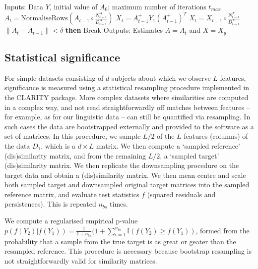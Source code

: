 \documentclass[a4]{article}
\newcommand{\+}[1]{\mathbf{#1}}
\newcommand{\norm}[1]{\|#1\|}
\begin{document}
\begin{algorithmic}
\STATE Inputs: Data $Y$, initial value of $A_0$; maximum number of iterations $t_{max}$
\STATE $A_{t} = \mathrm{NormaliseRows} \left(A_{t - 1} \circ \frac{N^{A}_{t-1}}{D^{A}_{t-1}} \right)$
\STATE $X_{t} = A_{t-1}^{+}Y_{1}(A^{+}_{t-1})^{T}$
\ELSE
\STATE $X_{t} = X_{t-1} \circ \frac{N^{X}_{t-1}}{D^{X}_{t-1}}$
\ENDIF
{} $\norm{A_{t}-A_{t-1}}< \delta$ {\bf then} Break
\ENDFOR
\STATE Outputs: Estimates $A=A_{t}$ and $X=X_{y}$
\end{algorithmic}


\subsection{Statistical significance}
\label{sec:pvals}

For simple datasets consisting of $d$ subjects about which we observe $L$ features, significance is measured using a statistical resampling procedure implemented in the CLARITY package.
More complex datasets where similarities are computed in a complex way, and not read straightforwardly off matches between features -- for example, as for our linguistic data -- can still be
quantified via resampling. In such cases the data are bootstrapped externally and provided to the software as a set of matrices.
In this procedure, we sample $L/2$ of the $L$ features (columns) of the data $D_1$, which is a $d \times L$ matrix. We then compute a `sampled reference' (dis)similarity matrix, and from the remaining $L/2$, a `sampled target' (dis)similarity matrix.
We then replicate the downsampling procedure on the target data and obtain a (dis)similarity matrix.
We then mean centre and scale both sampled target and downsampled original target matrices into the sampled reference matrix,
and evaluate test statistics $f$ (squared residuals and persistences). This is repeated $n_{bs}$ times.

We compute a regularised empirical p-value $p(f(Y_2) |f(Y_1)) = \frac{1}{1+n_{bs}}(1 + \sum_{i=1}^{n_{bs}}\mathbb{I}( f(Y_2) \ge f(Y_1))$, formed from the probability that a sample from the true target is as great or geater than the resampled reference. This procedure is necessary because bootstrap resampling  \cite{efron_introduction_1994} is not straightforwardly valid for similarity matrices.
\end{document}
